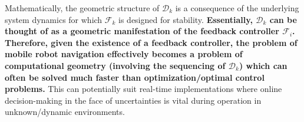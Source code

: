 \documentclass{article}
\begin{document}
\newline 
\newline Mathematically, the geometric structure of $\mathcal{D}_k$ is a consequence of the underlying system dynamics for which $\mathcal{F}_k$ is designed for stability. \textbf{Essentially, $\mathcal{D}_k$ can be thought of as a geometric manifestation of the feedback controller $\mathcal{F}_i$. Therefore, given the existence of a feedback controller, the problem of mobile robot navigation effectively becomes a problem of computational geometry (involving the sequencing of $\mathcal{D}_k$) which can often be solved much faster than optimization/optimal control problems.} This can potentially suit real-time implementations where online decision-making in the face of uncertainties is vital during operation in unknown/dynamic environments.
\printbibliography
\end{document}
